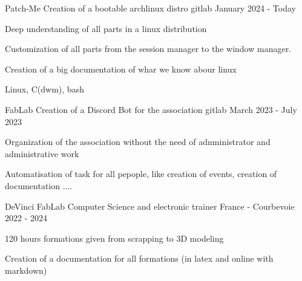 

\begin{cventries}

  \cventry
    {Patch-Me} %
    {Creation of a bootable archlinux distro} %
    {gitlab} %
    {January 2024 - Today} %
    {
      \begin{cvitems} %
        \item {Deep  understanding of all parts in a linux distribution}
        \item {Customization of all parts from the session manager to the window manager.}
        \item {Creation of a big documentation of whar we know abour linux}
      \end{cvitems}
    }
    {
      \begin{cvitemsskills} %
        \item {Linux, C(dwm), bash}
      \end{cvitemsskills}
  }

  \cventry
    {FabLab} %
    {Creation of a Discord Bot for the association} %
    {gitlab} %
    {March 2023 - July 2023} %
    {
      \begin{cvitems} %
        \item {Organization of the association without the need of adnministrator and administrative work}
        \item {Automatisation of task for all pepople, like creation of events, creation of documentation ....}
      \end{cvitems}
    }
    {}

  \cventry
    {DeVinci FabLab} %
    {Computer Science and electronic trainer} %
    {France - Courbevoie} %
    {2022 - 2024} %
    {
      \begin{cvitems} %
        \item {120 hours formations given from scrapping to 3D modeling}
        \item {Creation of a documentation for all formations (in latex and online with markdown)}
      \end{cvitems}
    }
    {}


\end{cventries}
